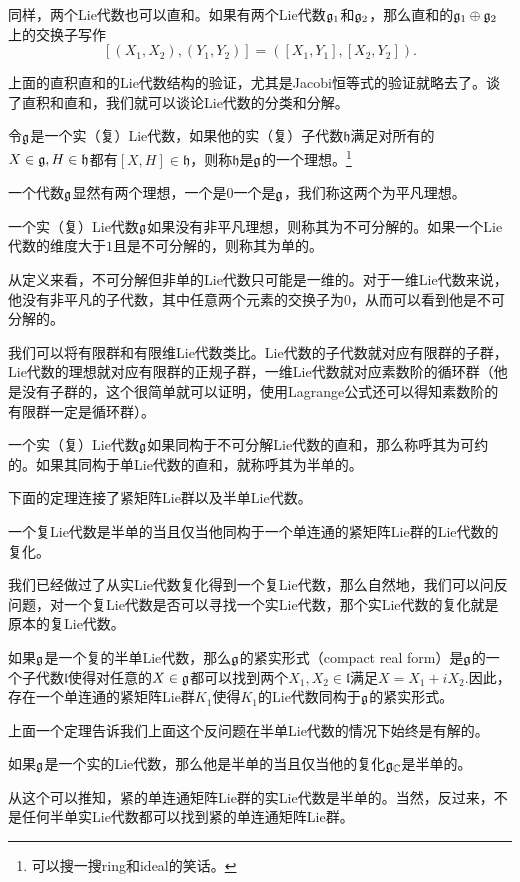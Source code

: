 同样，两个Lie代数也可以直和。如果有两个Lie代数${\mathfrak{g}}_1$和${\mathfrak{g}}_2$，那么直和的${\mathfrak{g}}_1\oplus{\mathfrak{g}}_2$上的交换子写作
\[
	[(X_1,X_2),(Y_1,Y_2)]=([X_1,Y_1],[X_2,Y_2]).
\]

上面的直积直和的Lie代数结构的验证，尤其是Jacobi恒等式的验证就略去了。谈了直积和直和，我们就可以谈论Lie代数的分类和分解。


\para
令${\mathfrak{g}}$是一个实（复）Lie代数，如果他的实（复）子代数$\mathfrak{h}$满足对所有的$X\in {\mathfrak{g}},H \in \mathfrak{h}$都有$[X,H]\in \mathfrak{h}$，则称$\mathfrak{h}$是${\mathfrak{g}}$的一个理想。\footnote{可以搜一搜ring和ideal的笑话。}

一个代数${\mathfrak{g}}$显然有两个理想，一个是$0$一个是${\mathfrak{g}}$，我们称这两个为平凡理想。

\para
一个实（复）Lie代数${\mathfrak{g}}$如果没有非平凡理想，则称其为不可分解的。如果一个Lie代数的维度大于$1$且是不可分解的，则称其为单的。

从定义来看，不可分解但非单的Lie代数只可能是一维的。对于一维Lie代数来说，他没有非平凡的子代数，其中任意两个元素的交换子为0，从而可以看到他是不可分解的。

我们可以将有限群和有限维Lie代数类比。Lie代数的子代数就对应有限群的子群，Lie代数的理想就对应有限群的正规子群，一维Lie代数就对应素数阶的循环群（他是没有子群的，这个很简单就可以证明，使用Lagrange公式还可以得知素数阶的有限群一定是循环群）。


\para
一个实（复）Lie代数${\mathfrak{g}}$如果同构于不可分解Lie代数的直和，那么称呼其为可约的。如果其同构于单Lie代数的直和，就称呼其为半单的。

下面的定理连接了紧矩阵Lie群以及半单Lie代数。
\begin{theo}
一个复Lie代数是半单的当且仅当他同构于一个单连通的紧矩阵Lie群的Lie代数的复化。
\end{theo}
我们已经做过了从实Lie代数复化得到一个复Lie代数，那么自然地，我们可以问反问题，对一个复Lie代数是否可以寻找一个实Lie代数，那个实Lie代数的复化就是原本的复Lie代数。

\para
如果${\mathfrak{g}}$是一个复的半单Lie代数，那么${\mathfrak{g}}$的紧实形式（compact real form）是${\mathfrak{g}}$的一个子代数$\mathfrak{l}$使得对任意的$X\in{\mathfrak{g}}$都可以找到两个$X_1,X_2\in\mathfrak{l}$满足$X=X_1+iX_2$.因此，存在一个单连通的紧矩阵Lie群$K_1$使得$K_1$的Lie代数同构于${\mathfrak{g}}$的紧实形式。

上面一个定理告诉我们上面这个反问题在半单Lie代数的情况下始终是有解的。

\pro 如果${\mathfrak{g}}$是一个实的Lie代数，那么他是半单的当且仅当他的复化${\mathfrak{g}}_{\mathbb{C}}$是半单的。

从这个可以推知，紧的单连通矩阵Lie群的实Lie代数是半单的。当然，反过来，不是任何半单实Lie代数都可以找到紧的单连通矩阵Lie群。

